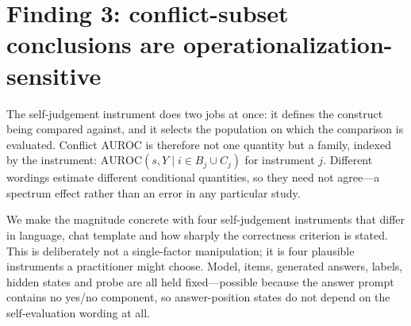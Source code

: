\documentclass[10pt]{article}
\begin{document}
\section{Finding 3: conflict-subset conclusions are operationalization-sensitive}
\label{sec:conflict}

The self-judgement instrument does two jobs at once: it defines the construct being compared
against, and it selects the population on which the comparison is evaluated. Conflict AUROC is
therefore not one quantity but a family, indexed by the instrument:
$\mathrm{AUROC}(s, Y \mid i \in B_j \cup C_j)$ for instrument $j$. Different wordings estimate
different conditional quantities, so they need not agree---a spectrum effect
\citep{ransohoff1978spectrum} rather than an error in any particular study.

We make the magnitude concrete with four self-judgement instruments that differ in language, chat
template and how sharply the correctness criterion is stated. This is deliberately not a
single-factor manipulation; it is four plausible instruments a practitioner might choose. Model,
items, generated answers, labels, hidden states and probe are all held fixed---possible because the
answer prompt contains no yes/no component, so answer-position states do not depend on the
self-evaluation wording at all.
\end{document}
